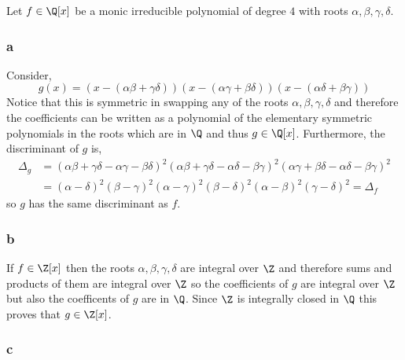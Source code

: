 \documentclass[12pt]{article}
\begin{document}
Let $f \in \Q[x]$ be a monic irreducible polynomial of degree $4$ with roots $\alpha, \beta, \gamma, \delta$. 

\subsubsection{a}

Consider,
\[ g(x) = (x - (\alpha \beta + \gamma \delta))(x - (\alpha \gamma + \beta \delta))(x - (\alpha \delta + \beta \gamma)) \]
Notice that this is symmetric in swapping any of the roots $\alpha, \beta, \gamma, \delta$ and therefore the coefficients can be written as a polynomial of the elementary symmetric polynomials in the roots which are in $\Q$ and thus $g \in \Q[x]$. Furthermore, the discriminant of $g$ is,
\begin{align*}
\Delta_g & = (\alpha \beta + \gamma \delta - \alpha \gamma - \beta \delta)^2 (\alpha \beta + \gamma \delta - \alpha \delta - \beta \gamma)^2 (\alpha \gamma + \beta \delta - \alpha \delta - \beta \gamma)^2
\\
& = (\alpha - \delta)^2 (\beta - \gamma)^2 (\alpha - \gamma)^2 (\beta - \delta)^2 (\alpha - \beta)^2 (\gamma - \delta)^2 = \Delta_f 
\end{align*}
so $g$ has the same discriminant as $f$.

\subsubsection{b}

If $f \in \Z[x]$ then the roots $\alpha, \beta, \gamma, \delta$ are integral over $\Z$ and therefore sums and products of them are integral over $\Z$ so the coefficients of $g$ are integral over $\Z$ but also the coefficents of $g$ are in $\Q$. Since $\Z$ is integrally closed in $\Q$ this proves that $g \in \Z[x]$. 

\subsubsection{c}
\end{document}
